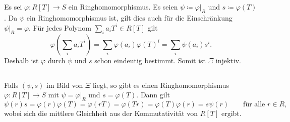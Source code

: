 \documentclass[a4paper, 10pt, numbers=noenddot]{scrartcl}
\begin{document}
\subsection{}

Es sei $\varphi \colon R[T] \to S$ ein Ringhomomorphismus.
Es seien $\psi \coloneqq \varphi|_R$ und $s \coloneqq \varphi(T)$.
Da $\psi$ ein Ringhomomorphismus ist, gilt dies auch für die Einschränkung $\psi|_R = \varphi$.
Für jedes Polynom $\sum_i a_i T^i \in R[T]$ gilt
\[
    \varphi\left( \sum_i a_i T^i \right)
  = \sum_i \varphi(a_i) \varphi(T)^i
  = \sum_i \psi(a_i) s^i.
\]
Deshalb ist $\varphi$ durch $\psi$ und $s$ schon eindeutig bestimmt.
Somit ist $\Xi$ injektiv.





\subsection{}

Falls $(\psi, s)$ im Bild von $\Xi$ liegt, so gibt es einen Ringhomomorphismus $\varphi \colon R[T] \to S$ mit $\psi = \varphi|_R$ und $s = \varphi(T)$.
Dann gilt
\[
    \psi(r) s
  = \varphi(r) \varphi(T)
  = \varphi(r T)
  = \varphi(T r)
  = \varphi(T) \varphi(r)
  = s \psi(r)
  \qquad
  \text{für alle $r \in R$},
\]
wobei sich die mittlere Gleichheit aus der Kommutativität von $R[T]$ ergibt.
\end{document}
